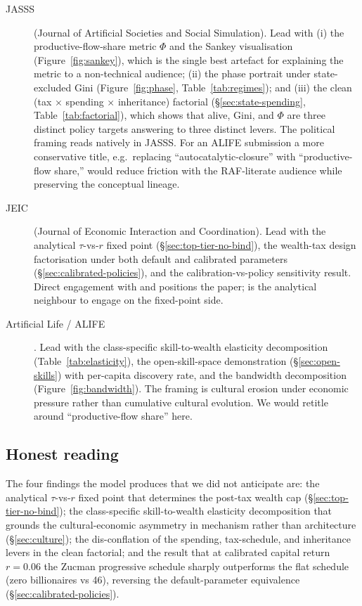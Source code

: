 \documentclass[11pt]{article}
\begin{document}
\begin{description}
\item[JASSS] (Journal of Artificial Societies and Social Simulation).
Lead with (i) the productive-flow-share metric $\Phi$ and the
Sankey visualisation (Figure~\ref{fig:sankey}), which is the
single best artefact for explaining the metric to a non-technical
audience; (ii) the phase portrait under state-excluded Gini
(Figure~\ref{fig:phase}, Table~\ref{tab:regimes}); and (iii) the
clean (tax $\times$ spending $\times$ inheritance) factorial
(\S\ref{sec:state-spending}, Table~\ref{tab:factorial}), which
shows that alive, Gini, and $\Phi$ are three distinct policy
targets answering to three distinct levers. The political framing
reads natively in JASSS. For an ALIFE submission a more conservative
title, e.g.\ replacing ``autocatalytic-closure'' with
``productive-flow share,'' would reduce friction with the
RAF-literate audience while preserving the conceptual lineage.

\item[JEIC] (Journal of Economic Interaction and Coordination).
Lead with the analytical $\tau$-vs-$r$ fixed point
(\S\ref{sec:top-tier-no-bind}), the wealth-tax design factorisation
under both default and calibrated parameters
(\S\ref{sec:calibrated-policies}), and the calibration-vs-policy
sensitivity result. Direct engagement with
\citet{spangler2022distribution} and \citet{cardoso2025wealth}
positions the paper; \citet{benhabib2011distribution} is the
analytical neighbour to engage on the fixed-point side.

\item[Artificial Life / ALIFE]. Lead with the class-specific
skill-to-wealth elasticity decomposition (Table~\ref{tab:elasticity}),
the open-skill-space demonstration (\S\ref{sec:open-skills}) with
per-capita discovery rate, and the bandwidth decomposition
(Figure~\ref{fig:bandwidth}). The framing is cultural erosion under
economic pressure rather than cumulative cultural evolution. We
would retitle around ``productive-flow share'' here.
\end{description}

\subsection{Honest reading}

The four findings the model produces that we did not anticipate are:
the analytical $\tau$-vs-$r$ fixed point that determines the
post-tax wealth cap (\S\ref{sec:top-tier-no-bind}); the class-specific
skill-to-wealth elasticity decomposition that grounds the
cultural-economic asymmetry in mechanism rather than architecture
(\S\ref{sec:culture}); the dis-conflation of the spending,
tax-schedule, and inheritance levers in the clean factorial; and the
result that at calibrated capital return $r=0.06$ the Zucman
progressive schedule sharply outperforms the flat schedule (zero
billionaires vs 46), reversing the default-parameter equivalence
(\S\ref{sec:calibrated-policies}).
\end{document}
